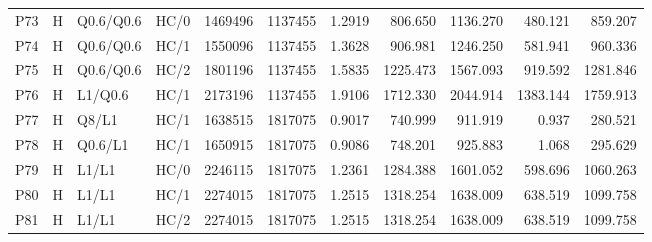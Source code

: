 \begin{longtable}{llllrrrrrrr}
P73 & H & Q0.6/Q0.6 & HC/0 & 1469496 & 1137455 & 1.2919 & 806.650 & 1136.270 & 480.121 & 859.207\\
P74 & H & Q0.6/Q0.6 & HC/1 & 1550096 & 1137455 & 1.3628 & 906.981 & 1246.250 & 581.941 & 960.336\\
P75 & H & Q0.6/Q0.6 & HC/2 & 1801196 & 1137455 & 1.5835 & 1225.473 & 1567.093 & 919.592 & 1281.846\\
P76 & H & L1/Q0.6 & HC/1 & 2173196 & 1137455 & 1.9106 & 1712.330 & 2044.914 & 1383.144 & 1759.913\\
P77 & H & Q8/L1 & HC/1 & 1638515 & 1817075 & 0.9017 & 740.999 & 911.919 & 0.937 & 280.521\\
P78 & H & Q0.6/L1 & HC/1 & 1650915 & 1817075 & 0.9086 & 748.201 & 925.883 & 1.068 & 295.629\\
P79 & H & L1/L1 & HC/0 & 2246115 & 1817075 & 1.2361 & 1284.388 & 1601.052 & 598.696 & 1060.263\\
P80 & H & L1/L1 & HC/1 & 2274015 & 1817075 & 1.2515 & 1318.254 & 1638.009 & 638.519 & 1099.758\\
P81 & H & L1/L1 & HC/2 & 2274015 & 1817075 & 1.2515 & 1318.254 & 1638.009 & 638.519 & 1099.758\\
\end{longtable}\endgroup
